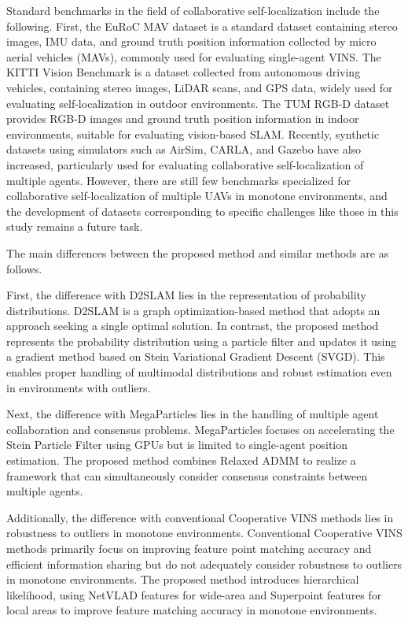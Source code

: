 \documentclass[a4paper,fleqn,10pt,twocolumn]{SICE_ISCS}
\begin{document}
Standard benchmarks in the field of collaborative self-localization include the following. First, the EuRoC MAV dataset is a standard dataset containing stereo images, IMU data, and ground truth position information collected by micro aerial vehicles (MAVs), commonly used for evaluating single-agent VINS. The KITTI Vision Benchmark is a dataset collected from autonomous driving vehicles, containing stereo images, LiDAR scans, and GPS data, widely used for evaluating self-localization in outdoor environments. The TUM RGB-D dataset provides RGB-D images and ground truth position information in indoor environments, suitable for evaluating vision-based SLAM. Recently, synthetic datasets using simulators such as AirSim, CARLA, and Gazebo have also increased, particularly used for evaluating collaborative self-localization of multiple agents. However, there are still few benchmarks specialized for collaborative self-localization of multiple UAVs in monotone environments, and the development of datasets corresponding to specific challenges like those in this study remains a future task.

The main differences between the proposed method and similar methods are as follows.

First, the difference with D2SLAM \cite{Xu2020} lies in the representation of probability distributions. D2SLAM is a graph optimization-based method that adopts an approach seeking a single optimal solution. In contrast, the proposed method represents the probability distribution using a particle filter and updates it using a gradient method based on Stein Variational Gradient Descent (SVGD). This enables proper handling of multimodal distributions and robust estimation even in environments with outliers.

Next, the difference with MegaParticles \cite{Koide2021} lies in the handling of multiple agent collaboration and consensus problems. MegaParticles focuses on accelerating the Stein Particle Filter using GPUs but is limited to single-agent position estimation. The proposed method combines Relaxed ADMM to realize a framework that can simultaneously consider consensus constraints between multiple agents.

Additionally, the difference with conventional Cooperative VINS methods \cite{Schmuck2018} lies in robustness to outliers in monotone environments. Conventional Cooperative VINS methods primarily focus on improving feature point matching accuracy and efficient information sharing but do not adequately consider robustness to outliers in monotone environments. The proposed method introduces hierarchical likelihood, using NetVLAD features for wide-area and Superpoint features for local areas to improve feature matching accuracy in monotone environments.
\end{document}

